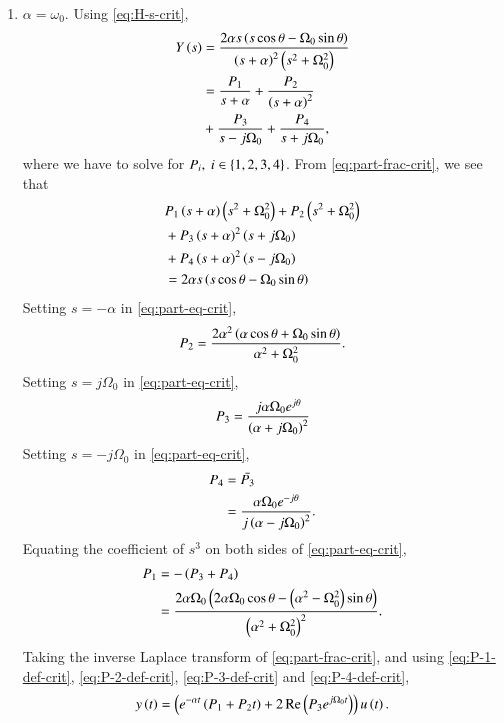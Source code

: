 \documentclass[journal,12pt,twocolumn]{IEEEtran}
\begin{document}
\begin{enumerate}[label=\theenumi.]
\begin{enumerate}
        \item \(\alpha = \omega_0\). Using \eqref{eq:H-s-crit},
        \begin{align}
            Y\left(s\right) &= \frac{2\alpha{}s\left(s\cos\theta-\Omega_0\sin\theta\right)}{\left(s+\alpha\right)^2\left(s^2+\Omega_0^2\right)} \\
            &= \frac{P_1}{s+\alpha} + \frac{P_2}{\left(s+\alpha\right)^2} \nonumber \\
            &+ \frac{P_3}{s-j\Omega_0} + \frac{P_4}{s+j\Omega_0},
            \label{eq:part-frac-crit}
        \end{align}
        where we have to solve for \(P_i,\ i \in \left\{1,2,3,4\right\}\). From 
        \eqref{eq:part-frac-crit}, we see that
        \begin{align}
            &P_1\left(s+\alpha\right)\left(s^2+\Omega_0^2\right) + P_2\left(s^2+\Omega_0^2\right) \nonumber \\
            &+ P_3\left(s+\alpha\right)^2\left(s+j\Omega_0\right) \nonumber \\
            &+ P_4\left(s+\alpha\right)^2\left(s-j\Omega_0\right) \nonumber \\
            &= 2\alpha{}s\left(s\cos\theta-\Omega_0\sin\theta\right)
            \label{eq:part-eq-crit}
        \end{align}
        Setting \(s = -\alpha\) in \eqref{eq:part-eq-crit},
        \begin{equation}
            P_2 = \frac{2\alpha^2\left(\alpha\cos\theta+\Omega_0\sin\theta\right)}{\alpha^2+\Omega_0^2}.
            \label{eq:P-2-def-crit}
        \end{equation}
        Setting \(s = j\Omega_0\) in \eqref{eq:part-eq-crit},
        \begin{equation}
            P_3 = \frac{j\alpha\Omega_0e^{j\theta}}{\left(\alpha+j\Omega_0\right)^2}
            \label{eq:P-3-def-crit}
        \end{equation}
        Setting \(s = -j\Omega_0\) in \eqref{eq:part-eq-crit},
        \begin{align}
            P_4 &= \bar{P_3} \\
                &= \frac{\alpha\Omega_0e^{-j\theta}}{j\left(\alpha-j\Omega_0\right)^2}.
            \label{eq:P-4-def-crit}
        \end{align}
        Equating the coefficient of \(s^3\) on both sides of \eqref{eq:part-eq-crit},
        \begin{align}
            P_1 &= -\left(P_3 + P_4\right) \\
                &= \frac{2\alpha\Omega_0\left(2\alpha\Omega_0\cos\theta-\left(\alpha^2-\Omega_0^2\right)\sin\theta\right)}{\left(\alpha^2+\Omega_0^2\right)^2}.
            \label{eq:P-1-def-crit}
        \end{align}
        Taking the inverse Laplace transform of \eqref{eq:part-frac-crit},
        and using \eqref{eq:P-1-def-crit}, \eqref{eq:P-2-def-crit},
        \eqref{eq:P-3-def-crit} and \eqref{eq:P-4-def-crit},
        \begin{equation}
            y\left(t\right) = \left(e^{-\alpha{}t}\left(P_1 + P_2t\right) + 2\mathop{\mathrm{Re}}\left(P_3e^{j\Omega_0t}\right)\right)u\left(t\right).
            \label{eq:y-t-crit}
        \end{equation}


\end{enumerate}
\end{enumerate}
\end{document}
